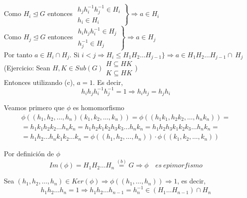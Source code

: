 \documentclass{article}
\begin{document}
Como $H_i \unlhd G$ entonces $\left. \begin{array}{c}
h_jh_i^{-1}h_j^{-1}\in H_i\\
h_i\in H_i
\end{array} \right\rbrace \Rightarrow a\in H_i$ \\

Como $H_j\unlhd G$ entonces $\left. \begin{array}{c}
h_ih_jh_i^{-1}\in H_j \\
h_j^{-1}\in H_j
\end{array} \right\rbrace \Rightarrow a\in H_j$ \\

Por tanto $a\in H_i\cap H_j$. Si $i<j\Rightarrow H_i\leq H_1H_2\ldots H_{j-1} \}\Rightarrow a\in H_1H_2\ldots H_{j-1}\cap~H_j$ \\

(Ejercicio: Sean $H,K\in Sub(G) \left.\begin{array}{c}
H\subseteq HK \\
K\subseteq HK
\end{array} \right.$) \\

Entonces utilizando (c), $a=1$. Es decir,
\begin{equation*}
h_ih_jh_i^{-1}h_j^{-1}=1\Rightarrow h_ih_j=h_jh_i
\end{equation*}
 
Veamos primero que $\phi$ es homomorfismo
\begin{gather*}
\phi((h_1,h_2,\ldots,h_n)(k_1,k_2,\ldots,k_n))=\phi((h_1k_1,h_2k_2,\ldots,h_nk_n))=\\
=h_1k_1h_2k_2\ldots h_nk_n=h_1h_2k_1k_2h_3k_3\ldots h_nk_n=h_1h_2h_3k_1k_2k_3\ldots h_nk_n=\\
=h_1h_2\ldots h_nk_1k_2\ldots k_n=\phi((h_1,h_2,\ldots,h_n))\cdot \phi((k_1,k_2,\ldots,k_n))
\end{gather*}

Por definición de $\phi$
\begin{equation*}
Im(\phi)=H_1H_2\ldots H_n\overset{(b)}{=} G\Rightarrow\phi \quad es\:epimorfismo
\end{equation*}

Sea $(h_1,h_2,\ldots,h_n)\in Ker(\phi)\Rightarrow \phi((h_1,\ldots,h_n))\Rightarrow 1$, es decir, 
\begin{equation*}
h_1h_2\ldots h_n=1\Rightarrow h_1h_2\ldots h_{n-1}=h_n^{-1}\in (H_1\ldots H_{n-1})\cap H_n
\end{equation*}
\end{document}
